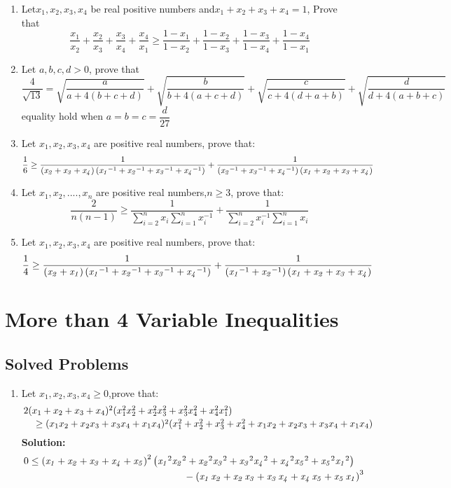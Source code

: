 \documentclass{report}
\begin{document}
\begin{enumerate}
	\item Let$ x_1,x_2,x_3,x_4$ be real positive numbers and$ x_1+x_2+x_3+x_4=1$, Prove that $$ \frac {x_1}{x_2} + \frac {x_2}{x_3} + \frac {x_3}{x_4} + \frac {x_4}{x_1} \geq \frac {1 - x_1}{1 - x_2} + \frac {1 - x_2}{1 - x_3} + \frac {1 - x_3}{1 - x_4} + \frac {1 - x_4}{1 - x_1}$$
	\item Let $a,b,c,d>0$, prove that\[\frac{4}{\sqrt{13}}=\sqrt {{\frac {a}{a+4 \left( b+c+d \right) }}}+\sqrt {{\frac {b}{b+4 \left( a+c+d \right) }}}+\sqrt{{\frac {c}{c+4 \left( d+a+b \right) }}}+\sqrt {{\frac {d}{d+4 \left( a+b+c \right) }}}\]equality hold when $a=b=c=\dfrac{d}{27}$
	\item Let $ x_1,x_2,x_3,x_4$ are positive real numbers, prove that:$$ \frac {1}{6} \geq {\frac {1}{\left( {\it x_2} + {\it x_3} + {\it x_4} \right) \left( {{\it x_1 }}^{ - 1} + {{\it x_2}}^{ - 1} + {{\it x_3}}^{ - 1} + {{\it x_4}}^{ - 1} \right) }} + {\frac {1}{\left( {{\it x_2}}^{ - 1} + {{\it x_3}}^{ - 1} + {{\it x_4}}^{ - 1} \right) \left( {\it x_1} + {\it x_2} + {\it x_3} + {\it x_4} \right) }}$$
	\item Let $ x_1,x_2,....,x_n$ are positive real numbers,$ n \geq 3$, prove that:$$ \frac {2}{n(n - 1)}\geq \frac {1}{\sum_{i = 2}^n{x_i}\sum_{i = 1}^n{x_i^{ - 1}}} + \frac {1}{\sum_{i = 2}^n{x_i^{ - 1}}\sum_{i = 1}^n{x_i}}$$
	\item Let $ x_1,x_2,x_3,x_4$ are positive real numbers, prove that:$$ \frac{1}{4} \geq {\frac {1}{\left( {\it x_2} + {\it x_1} \right) \left( {{\it x_1}}^{ - 1} + {{\it x_2}}^{ - 1} + {{\it x_3}}^{ - 1} + {{\it x_4}}^{ - 1} \right) }} + {\frac { 1}{\left( {{\it x_1}}^{ - 1} + {{\it x_2}}^{ - 1} \right) \left( {\it x_1} + {\it x_2} + {\it x_3} + {\it x_4} \right) }}$$
	
\end{enumerate}


\chapter{More than 4 Variable Inequalities}
\section{Solved Problems}
\begin{enumerate}
	\item Let $ x_1,x_2,x_3,x_4 \geq0$,prove that:$$\splitdfrac{2(x_1+x_2+x_3+x_4)^2(x_1^2x_2^2+x_2^2x_3^2+x_3^2x_4^2+x_4^2x_1^2)}{\geq (x_1x_2+x_2x_3+x_3x_4+x_1x_4)^2(x_1^2+x_2^2+x_3^2+x_4^2+x_1x_2+x_2x_3+x_3x_4+x_1x_4)}  $$
	\textbf{Solution:} $$\splitdfrac{0\leq \left( {\it x_1} + {\it x_2} + {\it x_3} + {\it x_4} + {\it x_5} \right) ^{2 } \left( {{\it x_1}}^{2}{{\it x_2}}^{2} + {{\it x_2}}^{2}{{\it x_3}}^{2} + {{ \it x_3}}^{2}{{\it x_4}}^{2} + {{\it x_4}}^{2}{{\it x_5}}^{2} + {{\it x_5}}^{2} {{\it x_1}}^{2} \right)}{- \left( {\it x_1}\,{\it x_2} + {\it x_2}\,{\it x_3} + {\it x_3}\,{\it x_4} + {\it x_4}\,{\it x_5} + {\it x_5}\,{\it x_1} \right) ^{3}} $$
\end{enumerate}
\end{document}
